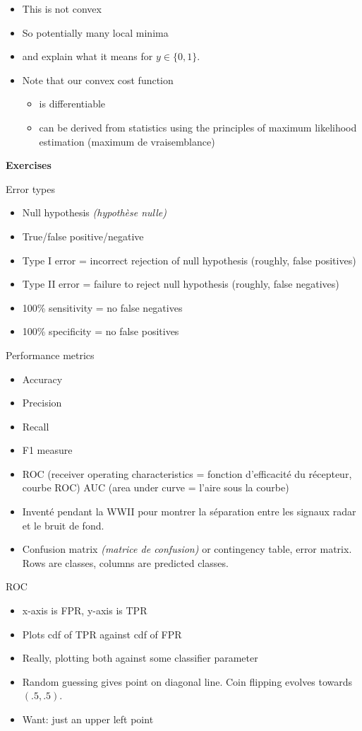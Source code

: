 \begin{itemize}
\item This is not convex
\item So potentially many local minima
\item {} and explain what it means for $y\in\{0,1\}$.
\item Note that our convex cost function
  \begin{itemize}
  \item is differentiable
  \item can be derived from statistics using the principles of maximum
    likelihood estimation (maximum de vraisemblance)
  \end{itemize}
\end{itemize}

\textbf{Exercises}

Error types
\begin{itemize}
\item Null hypothesis \textit{(hypothèse nulle)}
\item True/false positive/negative
\item Type I error = incorrect rejection of null hypothesis (roughly, false positives)
\item Type II error = failure to reject null hypothesis (roughly, false negatives)
\item 100\% sensitivity = no false negatives
\item 100\% specificity = no false positives
\end{itemize}


Performance metrics
\begin{itemize}
\item Accuracy
\item Precision
\item Recall
\item F1 measure
\item ROC (receiver operating characteristics = fonction d’efficacité
  du récepteur, courbe ROC) AUC (area under curve = l'aire sous la courbe)
\item Inventé pendant la WWII pour montrer la séparation entre les
  signaux radar et le bruit de fond.
\item Confusion matrix \textit{(matrice de confusion)} or contingency
  table, error matrix. Rows are classes, columns are predicted classes.
\end{itemize}

ROC
\begin{itemize}
\item x-axis is FPR, y-axis is TPR
\item Plots cdf of TPR against cdf of FPR
\item Really, plotting both against some classifier parameter
\item Random guessing gives point on diagonal line.  Coin flipping evolves towards $(.5, .5)$.
\item Want: just an upper left point
\end{itemize}


